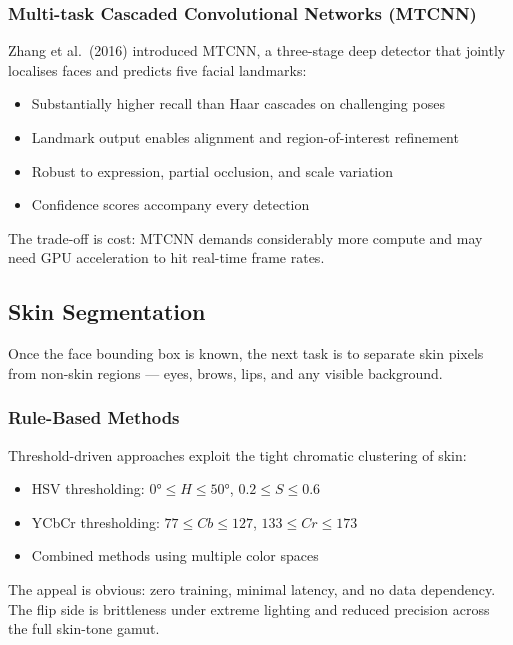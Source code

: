 \subsubsection{Multi-task Cascaded Convolutional Networks (MTCNN)}

Zhang et al.\ (2016) introduced MTCNN, a three-stage deep detector that jointly localises faces and predicts five facial landmarks:
\begin{itemize}
    \item Substantially higher recall than Haar cascades on challenging poses
    \item Landmark output enables alignment and region-of-interest refinement
    \item Robust to expression, partial occlusion, and scale variation
    \item Confidence scores accompany every detection
\end{itemize}

The trade-off is cost: MTCNN demands considerably more compute and may need GPU acceleration to hit real-time frame rates.

\subsection{Skin Segmentation}

Once the face bounding box is known, the next task is to separate skin pixels from non-skin regions — eyes, brows, lips, and any visible background.

\subsubsection{Rule-Based Methods}

Threshold-driven approaches exploit the tight chromatic clustering of skin:

\begin{itemize}
    \item HSV thresholding: $0° \leq H \leq 50°$, $0.2 \leq S \leq 0.6$
    \item YCbCr thresholding: $77 \leq Cb \leq 127$, $133 \leq Cr \leq 173$
    \item Combined methods using multiple color spaces
\end{itemize}

The appeal is obvious: zero training, minimal latency, and no data dependency. The flip side is brittleness under extreme lighting and reduced precision across the full skin-tone gamut.

